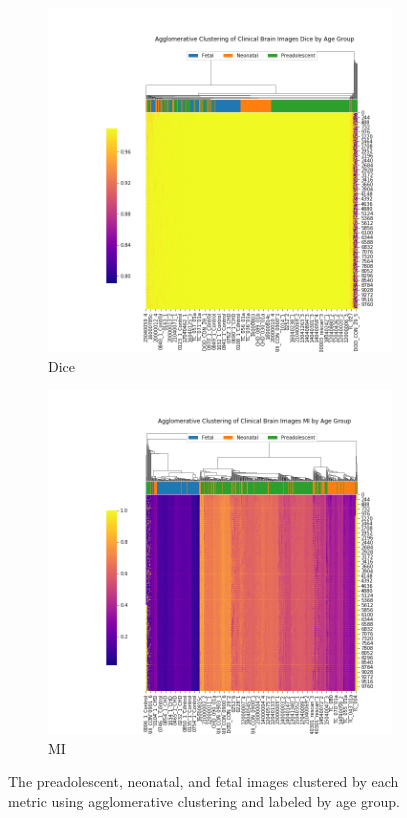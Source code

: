 \begin{figure}[t]
	\begin{subfigure}{0.49\textwidth}
		\centering
		\includegraphics[width=1.0\textwidth]{6/figures/agegroup-bold-dice-sns-agg.png}
		\caption{Dice}
	\end{subfigure}
	\begin{subfigure}{0.49\textwidth}
		\centering
		\includegraphics[width=1.0\textwidth]{6/figures/agegroup-bold-mi-sns-agg.png}
		\caption{MI}
	\end{subfigure}
\caption{The preadolescent, neonatal, and fetal images clustered by each metric using agglomerative clustering and labeled by age group.}
\label{fig:mochar-ages-sns-agg}
\end{figure}

